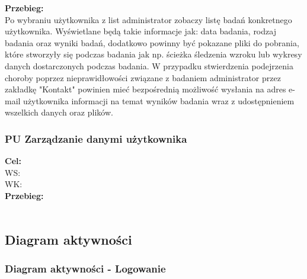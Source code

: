 \documentclass[12pt, letterpaper]{article}
\begin{document}
		\textbf{Przebieg:}\\
		Po wybraniu użytkownika z list administrator zobaczy listę badań konkretnego użytkownika. Wyświetlane będą takie informacje jak: data badania, rodzaj badania oraz wyniki badań, dodatkowo powinny być pokazane pliki do pobrania, które stworzyły się podczas badania jak np. ścieżka śledzenia wzroku lub wykresy danych dostarczonych podczas badania. W przypadku stwierdzenia podejrzenia choroby poprzez nieprawidłowości związane z badaniem administrator przez zakładkę "Kontakt" powinien mieć bezpośrednią możliwość wysłania na adres e-mail użytkownika informacji na temat wyników badania wraz z udostępnieniem wszelkich danych oraz plików.
		
		
		\subsubsection{PU Zarządzanie danymi użytkownika}
		
		\quad
		
		\textbf{Cel: }\\
		
		WS: \\
		
		WK: \\
		
		\textbf{Przebieg:}\\
		 \\
		

		

		\subsection{Diagram aktywności}
		
		\subsubsection{Diagram aktywności - Logowanie}
		
\end{document}
